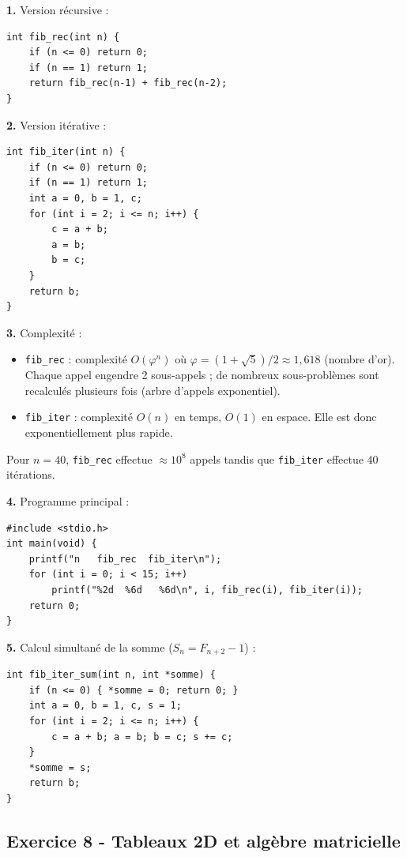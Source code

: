 \documentclass[12pt,a4paper]{article}
\begin{document}
\begin{boitecorrige}
\textbf{1.} Version récursive :
\begin{lstlisting}
int fib_rec(int n) {
    if (n <= 0) return 0;
    if (n == 1) return 1;
    return fib_rec(n-1) + fib_rec(n-2);
}
\end{lstlisting}

\textbf{2.} Version itérative :
\begin{lstlisting}
int fib_iter(int n) {
    if (n <= 0) return 0;
    if (n == 1) return 1;
    int a = 0, b = 1, c;
    for (int i = 2; i <= n; i++) {
        c = a + b;
        a = b;
        b = c;
    }
    return b;
}
\end{lstlisting}

\textbf{3.} Complexité :
\begin{itemize}[nosep]
  \item \texttt{fib\_rec} : complexité $O(\varphi^n)$ où $\varphi=(1+\sqrt{5})/2\approx1{,}618$ (nombre d'or). Chaque appel engendre 2 sous-appels ; de nombreux sous-problèmes sont recalculés plusieurs fois (arbre d'appels exponentiel).
  \item \texttt{fib\_iter} : complexité $O(n)$ en temps, $O(1)$ en espace. Elle est donc exponentiellement plus rapide.
\end{itemize}
Pour $n=40$, \texttt{fib\_rec} effectue $\approx 10^8$ appels tandis que \texttt{fib\_iter} effectue 40 itérations.

\textbf{4.} Programme principal :
\begin{lstlisting}
#include <stdio.h>
int main(void) {
    printf("n   fib_rec  fib_iter\n");
    for (int i = 0; i < 15; i++)
        printf("%2d  %6d   %6d\n", i, fib_rec(i), fib_iter(i));
    return 0;
}
\end{lstlisting}

\textbf{5.} Calcul simultané de la somme ($S_n = F_{n+2}-1$) :
\begin{lstlisting}
int fib_iter_sum(int n, int *somme) {
    if (n <= 0) { *somme = 0; return 0; }
    int a = 0, b = 1, c, s = 1;
    for (int i = 2; i <= n; i++) {
        c = a + b; a = b; b = c; s += c;
    }
    *somme = s;
    return b;
}
\end{lstlisting}
\end{boitecorrige}

\subsection*{Exercice 8 - Tableaux 2D et algèbre matricielle \niveau{\moyen}}
\end{document}

